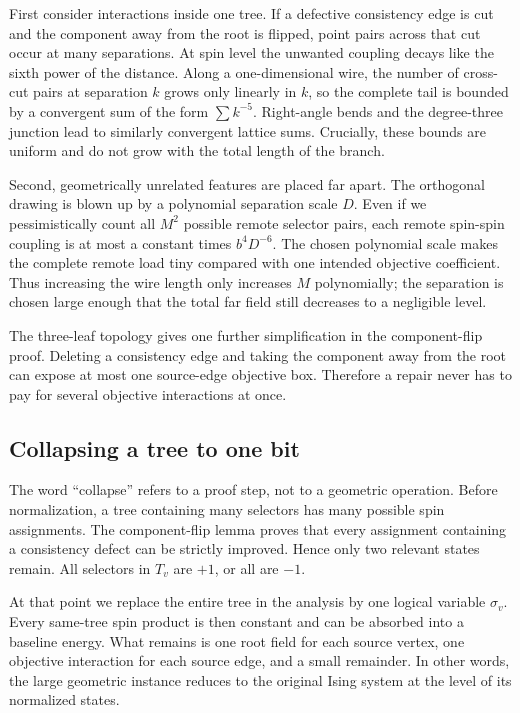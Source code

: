 \documentclass[12pt,a4paper]{article}
\begin{document}
First consider interactions inside one tree.  If a defective consistency edge is cut and the component away from the root is flipped, point pairs across that cut occur at many separations.  At spin level the unwanted coupling decays like the sixth power of the distance.  Along a one-dimensional wire, the number of cross-cut pairs at separation $k$ grows only linearly in $k$, so the complete tail is bounded by a convergent sum of the form $\sum k^{-5}$.  Right-angle bends and the degree-three junction lead to similarly convergent lattice sums.  Crucially, these bounds are uniform and do not grow with the total length of the branch.

Second, geometrically unrelated features are placed far apart.  The orthogonal drawing is blown up by a polynomial separation scale $D$.  Even if we pessimistically count all $M^2$ possible remote selector pairs, each remote spin-spin coupling is at most a constant times $b^4D^{-6}$.  The chosen polynomial scale makes the complete remote load tiny compared with one intended objective coefficient.  Thus increasing the wire length only increases $M$ polynomially; the separation is chosen large enough that the total far field still decreases to a negligible level.

The three-leaf topology gives one further simplification in the component-flip proof.  Deleting a consistency edge and taking the component away from the root can expose at most one source-edge objective box.  Therefore a repair never has to pay for several objective interactions at once.

\subsection*{Collapsing a tree to one bit}

The word ``collapse'' refers to a proof step, not to a geometric operation.  Before normalization, a tree containing many selectors has many possible spin assignments.  The component-flip lemma proves that every assignment containing a consistency defect can be strictly improved.  Hence only two relevant states remain.  All selectors in $T_v$ are $+1$, or all are $-1$.

At that point we replace the entire tree in the analysis by one logical variable $\sigma_v$.  Every same-tree spin product is then constant and can be absorbed into a baseline energy.  What remains is one root field for each source vertex, one objective interaction for each source edge, and a small remainder.  In other words, the large geometric instance reduces to the original Ising system at the level of its normalized states.
\end{document}
